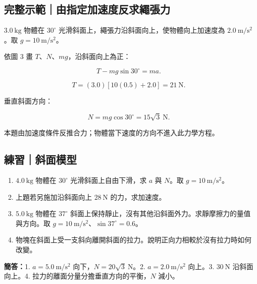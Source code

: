 \documentclass[11pt,a4paper]{article}
\providecommand{\tightlist}{%
  \setlength{\itemsep}{0pt}\setlength{\parskip}{0pt}}
\begin{document}
\begin{HandoutWorkedExample}

\subsection{完整示範｜由指定加速度反求繩張力}\label{ux5b8cux6574ux793aux7bc4ux7531ux6307ux5b9aux52a0ux901fux5ea6ux53cdux6c42ux7e69ux5f35ux529b}

\(3.0\ \mathrm{kg}\) 物體在 \(30^\circ\) 光滑斜面上，繩張力沿斜面向上，使物體向上加速度為 \(2.0\ \mathrm{m/s^2}\)。取 \(g=10\ \mathrm{m/s^2}\)。

依圖 3 畫 \(T\)、\(N\)、\(mg\)，沿斜面向上為正：

\[
T-mg\sin30^\circ=ma.
\]

\[
T=(3.0)\left[10(0.5)+2.0\right]=21\ \mathrm N.
\]

垂直斜面方向：

\[
N=mg\cos30^\circ=15\sqrt3\ \mathrm N.
\]

本題由加速度條件反推合力；物體當下速度的方向不進入此力學方程。

\end{HandoutWorkedExample}

\begin{HandoutSelfCheck}

\subsection{練習｜斜面模型}\label{ux7df4ux7fd2ux659cux9762ux6a21ux578b}

\begin{enumerate}
\def\labelenumi{\arabic{enumi}.}
\tightlist
\item
  \(4.0\ \mathrm{kg}\) 物體在 \(30^\circ\) 光滑斜面上自由下滑，求 \(a\) 與 \(N\)。取 \(g=10\ \mathrm{m/s^2}\)。
\item
  上題若另施加沿斜面向上 \(28\ \mathrm N\) 的力，求加速度。
\item
  \(5.0\ \mathrm{kg}\) 物體在 \(37^\circ\) 斜面上保持靜止，沒有其他沿斜面外力。求靜摩擦力的量值與方向。取 \(g=10\ \mathrm{m/s^2}\)、\(\sin37^\circ=0.6\)。
\item
  物塊在斜面上受一支斜向離開斜面的拉力。說明正向力相較於沒有拉力時如何改變。
\end{enumerate}

\textbf{簡答：}1. \(a=5.0\ \mathrm{m/s^2}\) 向下，\(N=20\sqrt3\ \mathrm N\)。2. \(a=2.0\ \mathrm{m/s^2}\) 向上。3. \(30\ \mathrm N\) 沿斜面向上。4. 拉力的離面分量分擔垂直方向的平衡，\(N\) 減小。

\end{HandoutSelfCheck}
\end{document}
